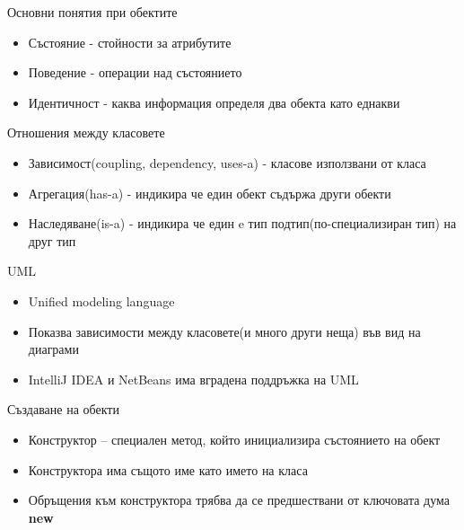 \documentclass{beamer}
\begin{document}
\begin{frame}{Основни понятия при обектите}
  \transdissolve
  \begin{itemize}
  \item Състояние - стойности за атрибутите
  \item Поведение - операции над състоянието
  \item Идентичност - каква информация определя два обекта като
    еднакви 
  \end{itemize}
\end{frame}

\begin{frame}{Отношения между класовете}
  \transdissolve
  \begin{itemize}
  \item Зависимост(coupling, dependency, uses-a) - класове използвани от класа
  \item Агрегация(has-a) -  индикира че един обект съдържа други обекти
  \item Наследяване(is-a) - индикира че един e  тип подтип(по-специализиран тип) на друг тип
  \end{itemize}
\end{frame}

\begin{frame}{UML}
  \transdissolve
  \begin{itemize}
  \item   Unified modeling language

  \item  Показва зависимости между класовете(и
    много други неща) във вид на диаграми
  \item IntelliJ IDEA и  NetBeans има вградена поддръжка на UML

  \end{itemize}
\end{frame}

\begin{frame}{Създаване на обекти}
  \transdissolve
  \begin{itemize}
  \item   Конструктор – специален метод, който
    инициализира състоянието на обект

   \item  Конструктора има същото име като
    името на класа
    \item Обръщения към конструктора трябва да
    се предшествани от ключовата дума
    \textbf{new}
  \end{itemize}
\end{frame}
\end{document}
